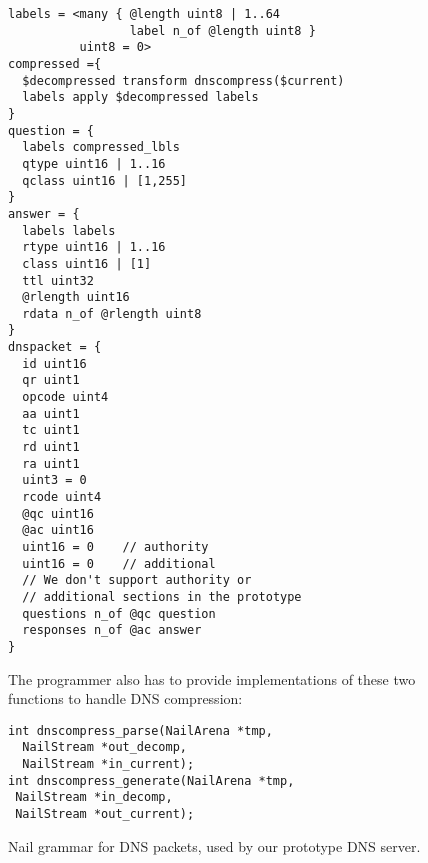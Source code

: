\begin{figure}
\begin{verbatim}
labels = <many { @length uint8 | 1..64
                 label n_of @length uint8 }
          uint8 = 0>
compressed ={
  $decompressed transform dnscompress($current)
  labels apply $decompressed labels
}
question = {
  labels compressed_lbls
  qtype uint16 | 1..16
  qclass uint16 | [1,255]
}
answer = {
  labels labels
  rtype uint16 | 1..16
  class uint16 | [1]
  ttl uint32
  @rlength uint16
  rdata n_of @rlength uint8
}
dnspacket = {
  id uint16
  qr uint1
  opcode uint4
  aa uint1
  tc uint1
  rd uint1
  ra uint1
  uint3 = 0
  rcode uint4
  @qc uint16
  @ac uint16
  uint16 = 0    // authority
  uint16 = 0    // additional
  // We don't support authority or
  // additional sections in the prototype
  questions n_of @qc question
  responses n_of @ac answer
}
\end{verbatim}
The programmer also has to provide implementations of these two functions to handle DNS compression:
\begin{verbatim}
int dnscompress_parse(NailArena *tmp,
  NailStream *out_decomp, 
  NailStream *in_current);
int dnscompress_generate(NailArena *tmp,
 NailStream *in_decomp, 
 NailStream *out_current);
\end{verbatim}
\caption{Nail grammar for DNS packets, used by our prototype DNS server.}
\label{fig:dns-full}
\end{figure}
